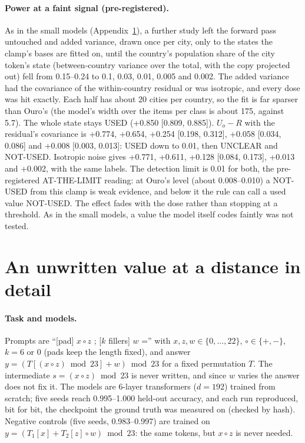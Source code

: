 \documentclass{article}
\begin{document}
\paragraph{Power at a faint signal (pre-registered).} As in the small models (Appendix~\ref{app:v230}), a further study left the forward pass untouched and added variance, drawn once per city, only to the states the clamp's bases are fitted on, until the country's population share of the city token's state (between-country variance over the total, with the copy projected out) fell from 0.15--0.24 to 0.1, 0.03, 0.01, 0.005 and 0.002. The added variance had the covariance of the within-country residual or was isotropic, and every dose was hit exactly. Each half has about 20 cities per country, so the fit is far sparser than Ouro's (the model's width over the items per class is about 175, against 5.7). The whole state stays USED (+0.850 [0.809, 0.885]). $U_o - R$ with the residual's covariance is +0.774, +0.654, +0.254 [0.198, 0.312], +0.058 [0.034, 0.086] and +0.008 [0.003, 0.013]: USED down to 0.01, then UNCLEAR and NOT-USED. Isotropic noise gives +0.771, +0.611, +0.128 [0.084, 0.173], +0.013 and +0.002, with the same labels. The detection limit is 0.01 for both, the pre-registered AT-THE-LIMIT reading: at Ouro's level (about 0.008--0.010) a NOT-USED from this clamp is weak evidence, and below it the rule can call a used value NOT-USED. The effect fades with the dose rather than stopping at a threshold. As in the small models, a value the model itself codes faintly was not tested.

\section{An unwritten value at a distance in detail}\label{app:v230}

\paragraph{Task and models.} Prompts are ``[pad] $x \circ z$ ; [$k$ fillers] $w$ ='' with $x, z, w \in \{0, \dots, 22\}$, $\circ \in \{+, -\}$, $k = 6$ or $0$ (pads keep the length fixed), and answer $y = (T[(x \circ z) \bmod 23] + w) \bmod 23$ for a fixed permutation $T$. The intermediate $s = (x \circ z) \bmod 23$ is never written, and since $w$ varies the answer does not fix it. The models are 6-layer transformers ($d = 192$) trained from scratch; five seeds reach 0.995--1.000 held-out accuracy, and each run reproduced, bit for bit, the checkpoint the ground truth was measured on (checked by hash). Negative controls (five seeds, 0.983--0.997) are trained on $y = (T_1[x] + T_2[z] \circ w) \bmod 23$: the same tokens, but $x \circ z$ is never needed.
\end{document}
